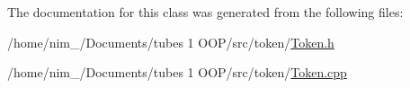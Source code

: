 The documentation for this class was generated from the following files\-:\begin{DoxyCompactItemize}
\item 
/home/nim\-\_/\-Documents/tubes 1 O\-O\-P/src/token/\hyperlink{_token_8h}{Token.\-h}\item 
/home/nim\-\_/\-Documents/tubes 1 O\-O\-P/src/token/\hyperlink{_token_8cpp}{Token.\-cpp}\end{DoxyCompactItemize}
